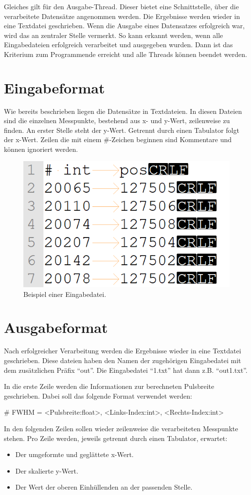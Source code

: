 Gleiches gilt für den Ausgabe-Thread.
Dieser bietet eine Schnittstelle, über die verarbeitete Datensätze angenommen werden.
Die Ergebnisse werden wieder in eine Textdatei geschrieben.
Wenn die Ausgabe eines Datensatzes erfolgreich war, wird das an zentraler Stelle vermerkt.
So kann erkannt werden, wenn alle Eingabedateien erfolgreich verarbeitet und ausgegeben wurden.
Dann ist das Kriterium zum Programmende erreicht und alle Threads können beendet werden.


\section{Eingabeformat}\label{sec:eingabe-format}
Wie bereits beschrieben liegen die Datensätze in Textdateien.
In diesen Dateien sind die einzelnen Messpunkte, bestehend aus x- und y-Wert, zeilenweise zu finden.
An erster Stelle steht der y-Wert.
Getrennt durch einen Tabulator folgt der x-Wert.
Zeilen die mit einem \#-Zeichen beginnen sind Kommentare und können ignoriert werden.
\begin{figure}[htb]
    \centering
    \includegraphics[width=0.5\linewidth]{images/eingabeDat_bsp}
    \caption{
        Beispiel einer Eingabedatei.
    }
    \label{fig:eingabe_dat_beispiel}
\end{figure}


\section{Ausgabeformat}\label{sec:ausgabeformat}
Nach erfolgreicher Verarbeitung werden die Ergebnisse wieder in eine Textdatei geschrieben.
Diese dateien haben den Namen der zugehörigen Eingabedatei mit dem zusätzlichen Präfix \enquote{out}.
Die Eingabedatei \enquote{1.txt} hat dann z.B. \enquote{out1.txt}.

In die erste Zeile werden die Informationen zur berechneten Pulsbreite geschrieben.
Dabei soll das folgende Format verwendet werden:
\begin{center}
    \# FWHM = <Pulsbreite:float>, <Links-Index:int>, <Rechts-Index:int>
\end{center}
In den folgenden Zeilen sollen wieder zeilenweise die verarbeiteten Messpunkte stehen.
Pro Zeile werden, jeweils getrennt durch einen Tabulator, erwartet:
\begin{itemize}[noitemsep]
    \item Der umgeformte und geglättete x-Wert.
    \item Der skalierte y-Wert.
    \item Der Wert der oberen Einhüllenden an der passenden Stelle.
\end{itemize}

